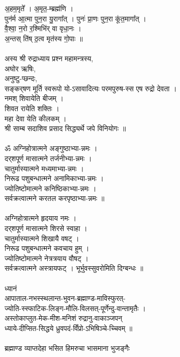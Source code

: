 अ॒हम॒मृते᳚ । अ॒मृत॒-म्ब्रह्म॑णि ।\\
पुन॑र्म आ॒त्मा पुन॒रा यु॒रागा᳚त् । पुनः॑ प्रा॒णः पुन॒रा कू॑त॒मागा᳚त् । \\
वै॒श्वा॒ न॒रो र॒श्मिभि॑र् वा   वृधा॒नः ।\\
अ॒न्तस् ति॑ष् ठ॒त्व मृत॑स्य गो॒पाः ॥\\
\\
अस्य श्री रुद्राध्याय प्रश्न महामन्त्रस्य,\\
अघोर ऋषिः,\\
अनुष्टु-प्छन्दः,\\
सङ्कर्​षण मूर्ति स्वरूपो यो-ऽसावादित्यः परमपुरुष-स्स एष रुद्रो देवता ।\\
नमश् शिवायेति बीजम् ।\\
शिवत रायेति शक्तिः ।\\
महा देवा येति कीलकम् ।\\
श्री साम्ब सदाशिव प्रसाद सिद्ध्यर्थे जपे विनियोगः ॥\\
\\
ॐ अग्निहोत्रात्मने अङ्गुष्ठाभ्या-न्नमः ।\\
दर्​शपूर्ण मासात्मने तर्जनीभ्या-न्नमः ।\\
चातुर्मास्यात्मने मध्यमाभ्या-न्नमः ।\\
निरूढ पशुबन्धात्मने अनामिकाभ्या-न्नमः ।\\
ज्योतिष्टोमात्मने कनिष्ठिकाभ्या-न्नमः ।\\
सर्वक्रत्वात्मने करतल करपृष्ठाभ्या-न्नमः ॥\\
\\
अग्निहोत्रात्मने हृदयाय नमः ।\\
दर्​शपूर्ण मासात्मने शिरसे स्वाहा ।\\
चातुर्मास्यात्मने शिखायै वषट् ।\\
निरूढ पशुबन्धात्मने कवचाय हुम् ।\\
ज्योतिष्टोमात्मने नेत्रत्रयाय वौषट् ।\\
सर्वक्रत्वात्मने अस्त्रायफट् । भूर्भुवस्सुवरोमिति दिग्बन्धः ॥\\
\\
ध्यानं\\
आपाताल-नभस्स्थलान्त-भुवन-ब्रह्माण्ड-माविस्फुरत्-\\
ज्योति-स्स्फाटिक-लिङ्ग-मौलि-विलसत्-पूर्णेन्दु-वान्तामृतैः ।\\
अस्तोकाप्लुत-मेक-मीश-मनिशं रुद्रानु-वाकाञ्जपन्\\
ध्याये-दीप्सित-सिद्धये ध्रुवपदं-विँप्रो-ऽभिषिञ्चे-च्चिवम् ॥\\
\\
ब्रह्माण्ड व्याप्तदेहा भसित हिमरुचा भासमाना भुजङ्गैः\\
